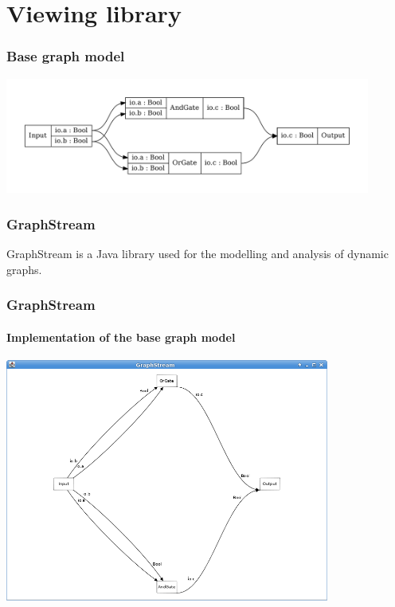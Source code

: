 \documentclass[11pt, handout]{beamer}
\begin{document}
\section{Viewing library}

\begin{frame}
  \frametitle{Base graph model}
  \begin{center}
    \includegraphics[width=0.9\textwidth]{base_graph_model}
  \end{center}
\end{frame}

\begin{frame}
  \frametitle{GraphStream}
  \begin{tcolorbox}
    GraphStream is a Java library used for the modelling and analysis of dynamic graphs.
  \end{tcolorbox}
\end{frame}

\begin{frame}
  \frametitle{GraphStream}
  \framesubtitle{Implementation of the base graph model}
  \begin{center}
    \includegraphics[width=0.8\textwidth]{graphstream_base_model}
  \end{center}
\end{frame}
\end{document}
